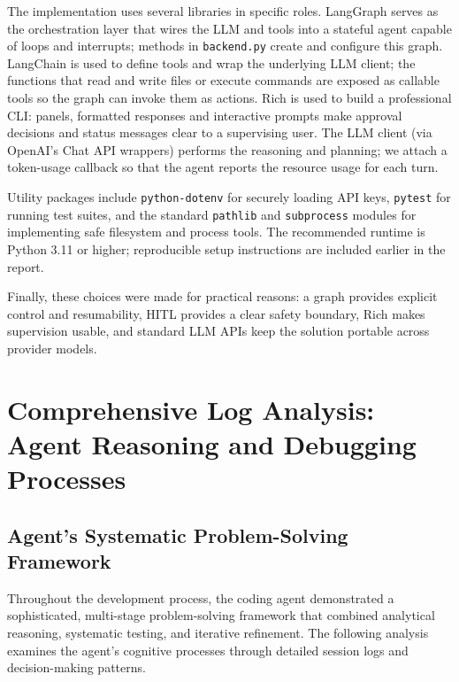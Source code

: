 \documentclass[12pt, a4paper]{article}
\begin{document}
The implementation uses several libraries in specific roles. LangGraph serves as the orchestration layer that wires the LLM and tools into a stateful agent capable of loops and interrupts; methods in \texttt{backend.py} create and configure this graph. LangChain is used to define tools and wrap the underlying LLM client; the functions that read and write files or execute commands are exposed as callable tools so the graph can invoke them as actions. Rich is used to build a professional CLI: panels, formatted responses and interactive prompts make approval decisions and status messages clear to a supervising user. The LLM client (via OpenAI's Chat API wrappers) performs the reasoning and planning; we attach a token-usage callback so that the agent reports the resource usage for each turn.

Utility packages include \texttt{python-dotenv} for securely loading API keys, \texttt{pytest} for running test suites, and the standard \texttt{pathlib} and \texttt{subprocess} modules for implementing safe filesystem and process tools. The recommended runtime is Python 3.11 or higher; reproducible setup instructions are included earlier in the report.

Finally, these choices were made for practical reasons: a graph provides explicit control and resumability, HITL provides a clear safety boundary, Rich makes supervision usable, and standard LLM APIs keep the solution portable across provider models.

\newpage
\section{Comprehensive Log Analysis: Agent Reasoning and Debugging Processes}

\subsection{Agent's Systematic Problem-Solving Framework}

Throughout the development process, the coding agent demonstrated a sophisticated, multi-stage problem-solving framework that combined analytical reasoning, systematic testing, and iterative refinement. The following analysis examines the agent's cognitive processes through detailed session logs and decision-making patterns.
\end{document}
